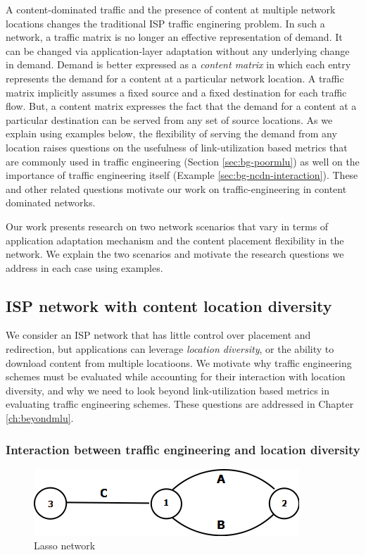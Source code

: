 A content-dominated traffic and the presence of content at multiple network locations changes the traditional ISP traffic enginering problem. In such a network, a traffic matrix is no longer an effective representation of demand. It can be changed via application-layer adaptation without any underlying change in demand. Demand is better expressed as a \emph{content matrix} in which each entry represents the demand for a content at a particular network location. A traffic matrix implicitly assumes a fixed source and a fixed destination for each traffic flow. But, a content matrix expresses the fact that the demand for a content at a particular destination can be served from any set of source locations. As we explain using examples below, the flexibility of serving the demand from any location raises questions on the usefulness of link-utilization based metrics that are commonly used in traffic engineering (Section \ref{sec:bg-poormlu}) as well on the importance of traffic engineering itself (Example \ref{sec:bg-ncdn-interaction}). These and other related questions motivate our work on traffic-engineering in content dominated networks.

Our work presents research on two network scenarios that vary in terms of application adaptation mechanism and the content placement flexibility in the network. We explain the two scenarios and motivate the research questions we address in each case using examples.

\subsection{ISP network with content location diversity}
\label{sec:bg-locdiv}
We consider an ISP network that has little control over placement and redirection, but applications can leverage \emph{location diversity}, or  the ability to download content from multiple locatioons. We motivate why traffic engineering schemes must be evaluated while accounting for their interaction with location diversity, and why we need to look beyond link-utilization based metrics in evaluating traffic engineering schemes. These questions are addressed in Chapter \ref{ch:beyondmlu}.

\subsubsection{Interaction between traffic engineering and location diversity}
\label{sec:bg-3node}

\begin{figure}[tbh]
	\centering
	\label{fig:3node-bg}\includegraphics[scale=0.5]{final_images/Diagram3node.png}
	\caption{Lasso network}
\end{figure}

